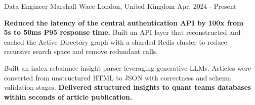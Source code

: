 

\begin{cventries}

  \cventry
    {Data Engineer} %
    {Marshall Wace} %
    {London, United Kingdom} %
    {Apr. 2024 - Present} %
    {
      \begin{cvitems} %
        \item {\textbf{Reduced the latency of the central authentication API by 100x from 5s to 50ms P95 response time.} Built an API layer that reconstructed and cached the Active Directory graph with a sharded Redis cluster to reduce recursive search space and remove redundant calls.}
        \item {Built an index rebalance insight parser leveraging generative LLMs. Articles were converted from unstructured HTML to JSON with correctness and schema validation stages. \textbf{Delivered structured insights to quant teams databases within seconds of article publication.}}
      \end{cvitems}
    }


\end{cventries}
